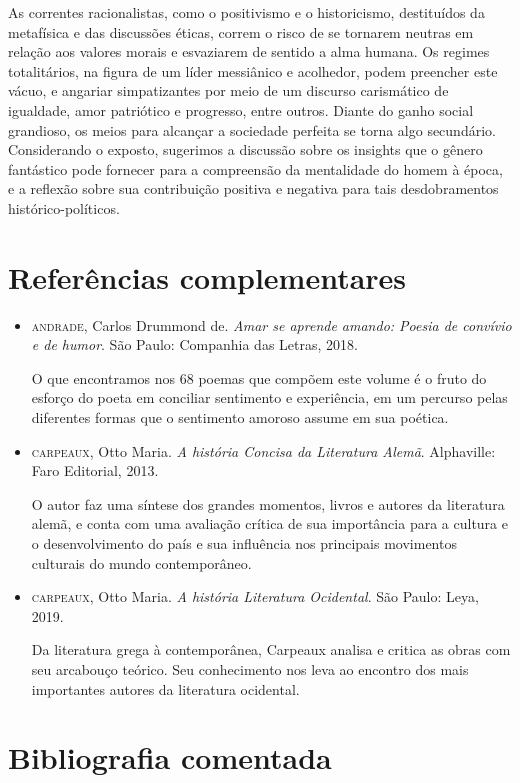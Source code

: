 \documentclass[11pt]{extarticle}
\begin{document}
As correntes racionalistas, como o positivismo e o historicismo,
destituídos da metafísica e das discussões éticas, correm o risco de
se tornarem neutras em relação aos valores morais e esvaziarem de
sentido a alma humana. Os regimes totalitários, na figura de um líder
messiânico e acolhedor, podem preencher este vácuo, e angariar
simpatizantes por meio de um discurso carismático de igualdade, amor
patriótico e progresso, entre outros. Diante do ganho social
grandioso, os meios para alcançar a sociedade perfeita se torna algo
secundário. Considerando o exposto, sugerimos a discussão sobre os
insights que o gênero fantástico pode fornecer para a compreensão da
mentalidade do homem à época, e a reflexão sobre sua contribuição
positiva e negativa para tais desdobramentos histórico-políticos.

\section{Referências complementares}

\begin{itemize}
\item\textsc{andrade}, Carlos Drummond de. \textit{Amar se aprende amando: Poesia de
convívio e de humor}. São Paulo: Companhia das Letras, 2018.

O que encontramos nos 68 poemas que compõem este volume é o fruto do
esforço do poeta em conciliar sentimento e experiência, em um percurso
pelas diferentes formas que o sentimento amoroso assume em sua poética.

\item\textsc{carpeaux}, Otto Maria. \textit{A história Concisa da Literatura Alemã}.
Alphaville: Faro Editorial, 2013.

O autor faz uma síntese dos grandes momentos, livros e autores da
literatura alemã, e conta com uma avaliação crítica de sua importância
para a cultura e o desenvolvimento do país e sua influência nos
principais movimentos culturais do mundo contemporâneo.

\item\textsc{carpeaux}, Otto Maria. \textit{A história Literatura Ocidental}. São
Paulo: Leya, 2019.

Da literatura grega à contemporânea, Carpeaux analisa e critica as obras
com seu arcabouço teórico. Seu conhecimento nos leva ao encontro dos
mais importantes autores da literatura ocidental.
\end{itemize}

\section{Bibliografia comentada}
\end{document}
